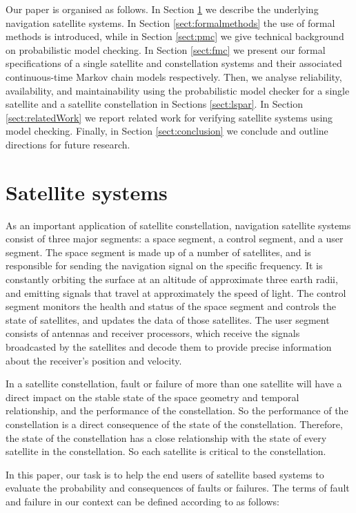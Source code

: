 \documentclass[preprint,12pt]{qrei}
\begin{document}
Our paper is organised as follows. In Section \ref{sect:system} we describe the underlying navigation satellite systems. In Section \ref{sect:formalmethods} the use of formal methods is introduced, while in Section \ref{sect:pmc} we give technical background on probabilistic model checking. In Section \ref{sect:fmc} we present our formal specifications of a single satellite and constellation systems and their associated continuous-time Markov chain models respectively. Then, we analyse reliability, availability, and maintainability using the probabilistic model checker  for a single satellite and a satellite constellation in Sections \ref{sect:lspar}. In Section \ref{sect:relatedWork} we report related work for verifying satellite systems using model checking. Finally, in Section \ref{sect:conclusion} we conclude and outline directions for future research.



\section{Satellite systems}\label{sect:system}

As an important application of satellite constellation, navigation satellite systems consist of three major segments: a space segment, a control segment, and a user segment. The space segment is made up of a number of satellites, and is responsible for sending the navigation signal on the specific frequency. It is constantly orbiting the surface at an altitude of approximate three earth radii, and emitting signals that travel at approximately the speed of light. The control segment monitors the health and status of the space segment and controls the state of satellites, and updates the data of those satellites. The user segment consists of antennas and receiver processors, which receive the signals broadcasted by the satellites and decode them to provide precise information about the receiver’s position and velocity.

In a satellite constellation, fault or failure of more than one satellite will have a direct impact on the stable state of the space geometry and temporal relationship, and the performance of the constellation. So the performance of the constellation is a direct consequence of the state of the constellation. Therefore, the state of the constellation has a close relationship with the state of every satellite in the constellation. So each satellite is critical to the constellation.

In this paper, our task is to help the end users of satellite based systems to evaluate the probability and consequences of faults or failures. The terms of fault and failure in our context can be defined according to \cite{Czi13} as follows:
\end{document}
